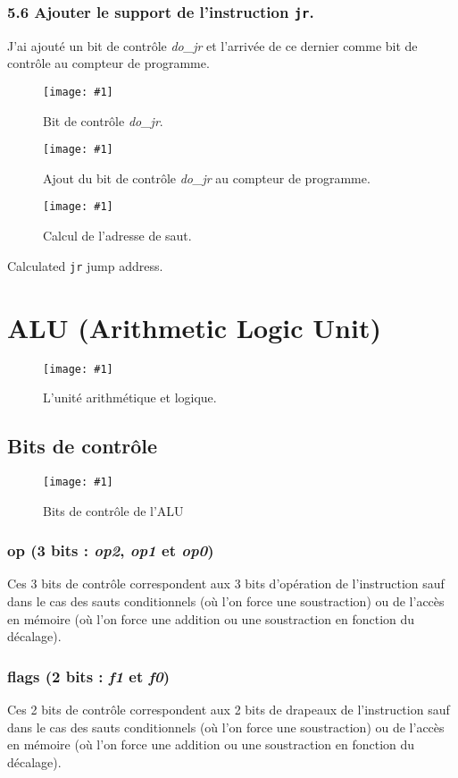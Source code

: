 \documentclass[twoside, 12pt, a4paper]{article}
\newcommand{\cf}[3]{
    \begin{figure}[!h]
        \centering
        \texttt{[image: \#1]}
    \caption{#3}\label{Fig:#1}
    \end{figure}
}
\newcommand{\hcf}[2]{\cf{#1}{.75}{#2}}
\begin{document}
        \subsubsection*{\textbf{5.6} Ajouter le support de l'instruction \texttt{jr}.}

        J'ai ajouté un bit de contrôle \textit{do\_jr} et l'arrivée de ce dernier comme bit de contrôle au compteur de programme.

        \hcf{do_jr.png}{Bit de contrôle \textit{do\_jr}.}

        \hcf{clock_jr.png}{Ajout du bit de contrôle \textit{do\_jr} au compteur de programme.}

    \hcf{jmp_calc.png}{Calcul de l'adresse de saut.}
    Calculated \texttt{jr} jump address.
    
        \newpage
        
\section{ALU (Arithmetic Logic Unit)}

    \hcf{ALU.png}{L'unité arithmétique et logique.}

    \subsection{Bits de contrôle}

    \hcf{ctrl_ALU.png}{Bits de contrôle de l'ALU}
    
        \subsubsection{op (3 bits : \textit{op2}, \textit{op1} et \textit{op0})}
        Ces 3 bits de contrôle correspondent aux 3 bits d'opération de l'instruction sauf dans le cas des sauts conditionnels (où l'on force une soustraction) ou de l'accès en mémoire (où l'on force une addition ou une soustraction en fonction du décalage).
        
        \subsubsection{flags (2 bits : \textit{f1} et \textit{f0})}
        Ces 2 bits de contrôle correspondent aux 2 bits de drapeaux de l'instruction sauf dans le cas des sauts conditionnels (où l'on force une soustraction) ou de l'accès en mémoire (où l'on force une addition ou une soustraction en fonction du décalage).
        
\end{document}
